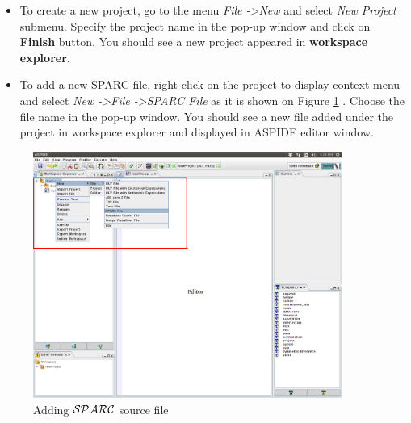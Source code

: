 \documentclass[12pt, letterpaper]{article}
\begin{document}
\begin{itemize}
\item To create a new project, go to the menu \textit{File -\textgreater New} and select \textit{New Project} submenu. Specify the project name in the pop-up window and click on \textbf{Finish} button. You should see a new project appeared in \textbf{workspace explorer}. 
\item To add a new SPARC file, right click on the project to display context menu and select \textit{New -\textgreater File -\textgreater SPARC File} as it is shown on Figure \ref{fig:createfile} . Choose the file name in the pop-up window. You should see a new file added under the project in workspace explorer and displayed in ASPIDE editor window.
\end{itemize}

\begin{figure}[ht]
\centering
\includegraphics[width=0.9\textwidth]{project.png}
\caption{Adding  ${\cal SPARC}$ source file }
\label{fig:createfile}
\end{figure}
  
\end{document}
